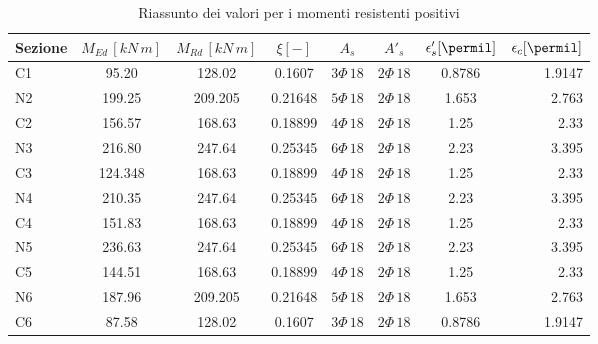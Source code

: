 \begin{table}
	\centering
	\caption{Riassunto dei valori per i momenti resistenti positivi}
	\label{tab:verificaSezione_slu}
	\begin{tabular*}{\textwidth}{l @{\extracolsep{\fill}} ccccccr}
		\toprule
		Sezione &  $M_{Ed}\,[kN\,m]$ &  $M_{Rd}\,[kN\,m]$ & $\xi [-]$ &$A_s$ &$A'_s$&$\epsilon'_s [\permil]$ &$\epsilon_c [\permil]$\\
		\midrule
		C1 &    95.20& 128.02&0.1607& $3\Phi\,18$&$2\Phi\,18$&0.8786&1.9147\\
		N2 &   199.25 & 209.205&0.21648&$5\Phi\,18$&$2\Phi\,18$&1.653 & 2.763\\
		C2 &   156.57 &168.63 &0.18899&$4\Phi\,18$&$2\Phi\,18$&1.25&2.33 \\
		N3 &216.80&247.64&0.25345 &$6\Phi\,18$&$2\Phi\,18$&2.23&3.395\\
		C3 &   124.348 &168.63&0.18899 &$4\Phi\,18$&$2\Phi\,18$&1.25&2.33\\
		N4 &210.35&247.64&0.25345&$6\Phi\,18$&$2\Phi\,18$&2.23&3.395\\
		C4 &151.83&168.63&0.18899&$4\Phi\,18$&$2\Phi\,18$&1.25&2.33\\
		N5&236.63&247.64&0.25345&$6\Phi\,18$&$2\Phi\,18$&2.23&3.395 \\
		C5 &144.51&168.63&0.18899 &$4\Phi\,18$&$2\Phi\,18$&1.25&2.33\\
		N6 &187.96&209.205&0.21648&$5\Phi\,18$&$2\Phi\,18$&1.653&2.763\\
		C6 &87.58&128.02&0.1607&$3\Phi\,18$&$2\Phi\,18$&0.8786&1.9147\\
		\bottomrule
	\end{tabular*}
\end{table}

